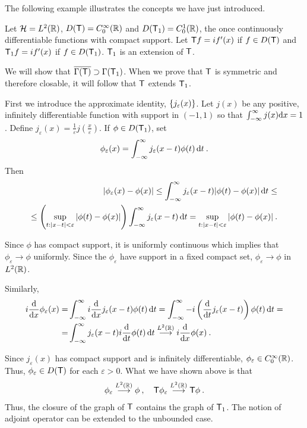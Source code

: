 The following example illustrates the concepts we have just introduced.

\begin{example}
Let $\mathcal{H} = L^{2}(\mathbb{R})$, $D(\mathsf{T}) = C_0^\infty(\mathbb{R})$ and $D(\mathsf{T}_1) = C_0^1(\mathbb{R})$, the once continuously differentiable functions with compact support.
Let $\mathsf{T} f= i f'(x)$ if $f \in D(\mathsf{T})$ and $\mathsf{T}_1 f= i f'(x)$ if  $f \in D(\mathsf{T}_1)$. $\mathsf{T}_1$ is an extension of $\mathsf{T}$.

We will show that $\overline{\Gamma(\mathsf{T})} \supset \Gamma(\mathsf{T}_1)$. When we prove that $\mathsf{T}$ is symmetric and therefore closable, it will follow that $\mathsf{T}$ extends $\mathsf{T}_1$. 

First we introduce the approximate identity, $\left \lbrace j_\varepsilon(x) \right \rbrace$. Let $j(x)$ be any positive, infinitely differentiable function with support in $(-1, 1)$ so that $\int_{-\infty}^{\infty} j(x) \mathrm{d} x = 1$. Define $j_\varepsilon(x) = \frac{1}{\varepsilon} j(\frac{x}{\varepsilon})$. If $\phi \in D(\mathsf{T}_1)$, set \begin{align}
    \phi_\varepsilon(x) = \int_{-\infty}^{\infty} j_\varepsilon (x-t) \phi(t) \, \mathrm{d} t \:.
\end{align}
Then \begin{align}
    |\phi_\varepsilon(x) - \phi(x)| \leq \int_{-\infty}^{\infty} j_\varepsilon (x-t) |\phi(t) - \phi(x)| \, \mathrm{d} t\leq \\
    \leq \left( \sup_{t : |x-t| < \varepsilon} |\phi(t) - \phi(x)| \right) \int_{-\infty}^{\infty} j_\varepsilon (x-t) \, \mathrm{d} t=  \sup_{t : |x-t| < \varepsilon} |\phi(t) - \phi(x)| \:. \nonumber
\end{align}


Since $\phi$ has compact support, it is uniformly continuous which implies that $\phi_\varepsilon \rightarrow \phi$ uniformly. Since the $\phi_\varepsilon$ have support in a fixed compact set, $\phi_\varepsilon \rightarrow \phi$ in $L^{2}(\mathbb{R})$.

Similarly,
\begin{align}
    i \dfrac{\mathrm{d}}{\mathrm{d}x} \phi_\varepsilon(x) 
    =&
    \int_{-\infty}^{\infty} i \dfrac{\mathrm{d}}{\mathrm{d}x} j_\varepsilon (x-t) \phi(t) \, \mathrm{d} t 
    = 
    \int_{-\infty}^{\infty} - i \left( \dfrac{\mathrm{d}}{\mathrm{d}t} j_\varepsilon (x-t) \right) \phi(t) \, \mathrm{d} t 
    = \\ =&
    \int_{-\infty}^{\infty} j_\varepsilon(x-t) i \dfrac{\mathrm{d}}{\mathrm{d}t} \phi(t) \, \mathrm{d} t 
    \overset{L^{2}(\mathbb{R})} \longrightarrow
     i  \dfrac{\mathrm{d}}{\mathrm{d}x} \phi(x) \:. \nonumber
\end{align}

Since $j_\varepsilon(x)$ has compact support and is infinitely differentiable, $\phi_\varepsilon \in C_0^\infty(\mathbb{R})$.
Thus, $\phi_\varepsilon \in D(\mathsf{T})$ for each $\varepsilon >0$. What we have shown above is that \begin{align}
    \phi_\varepsilon\overset{L^{2}(\mathbb{R})} \longrightarrow \phi \:, 
	\quad     
    \mathsf{T} \phi_\varepsilon \overset{L^{2}(\mathbb{R})} \longrightarrow \mathsf{T} \phi \:.
\end{align}
Thus, the closure of the graph of $\mathsf{T}$ contains the graph of $\mathsf{T}_1$. The notion of adjoint operator can be extended to the unbounded case.
\end{example}


